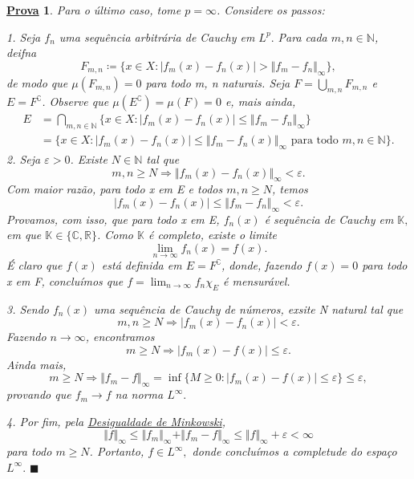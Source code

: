 \documentclass{article}
\newtheorem*{proof*}{\underline{Prova}}
\renewcommand\qedsymbol{$\blacksquare$}
\begin{document}
\begin{proof*}
  
  Para o último caso, tome \(p=\infty\). Considere os passos: 

  1. Seja \(f_{n}\) uma sequência arbitrária de Cauchy em \(L^{p}.\) Para cada \(m, n\in \mathbb{N}\), deifna 
    \[
      F_{m, n}\coloneqq \{x\in X: |f_{m}(x) - f_{n}(x)| > \Vert f_{m}-f_{n} \Vert_{\infty}\},
    \]
  de modo que \(\mu (F_{m, n})=0\) para todo m, n naturais. Seja \(F = \bigcup_{m, n}^{}F_{m, n}\) e \(E = F ^{\complement}\). Observe que \(\mu (E ^{\complement}) = \mu (F) = 0\) e, mais ainda, 
 \begin{align*}
   E &=\bigcap_{m, n\in \mathbb{N}}^{}\{x\in X: |f_{m}(x) - f_{n}(x)| \leq \Vert f_{m}-f_{n} \Vert_{\infty}\}\\
     &=\{x\in X: |f_{m}(x) - f_{n}(x)| \leq \Vert f_{m} - f_{n}(x) \Vert_{\infty}\text{ para todo }m, n\in \mathbb{N}\}.
 \end{align*}
  2. Seja \(\varepsilon  > 0\). Existe \(N\in \mathbb{N}\) tal que 
    \[
      m, n\geq N \Rightarrow \Vert f_{m}(x) - f_{n}(x) \Vert_{\infty} < \varepsilon .
    \]
  Com maior razão, para todo x em E e todos \(m, n\geq N\), temos 
    \[
      |f_{m}(x) - f_{n}(x)|\leq \Vert f_{m} - f_{n} \Vert_{\infty} < \varepsilon .
    \]
    Provamos, com isso, que para todo x em E, \(f_{n}(x)\) é sequência de Cauchy em \(\mathbb{K},\) em que \(\mathbb{K}\in \{\mathbb{C}, \mathbb{R}\}\). Como \(\mathbb{K}\) é completo, existe o limite 
      \[
        \lim_{n\to \infty}f_{n}(x) = f(x).
      \]
    É claro que \(f(x)\) está definida em \(E = F ^{\complement}\), donde, fazendo \(f(x) = 0\) para todo x em F, concluímos que \(f = \lim_{n\to \infty}f_{n}\chi_{E}\) é mensurável.

  3. Sendo \(f_{n}(x)\) uma sequência de Cauchy de números, exsite N natural tal que 
    \[
      m, n \geq N \Rightarrow |f_{m}(x) - f_{n}(x)| < \varepsilon .
    \]
  Fazendo \(n\to \infty\), encontramos 
    \[
      m\geq N \Rightarrow |f_{m}(x) - f(x)|\leq \varepsilon .
    \]
  Ainda mais, 
    \[
    m\geq N \Rightarrow \Vert f_{m}-f \Vert_{\infty} = \inf_{}\{M\geq 0: |f_{m}(x) - f(x)|\leq \varepsilon \}\leq \varepsilon,
    \]
    provando que \(f_m\to f\) na norma \(L^{\infty}.\)

  4. Por fim, pela \hyperlink{minkowski}{\textit{Desigualdade de Minkowski}}, 
    \[
      \Vert f \Vert_{\infty}\leq \Vert f_{m} \Vert_{\infty} + \Vert f_m - f \Vert_{\infty}\leq \Vert f \Vert_{\infty} + \varepsilon  < \infty
    \]
  para todo \(m\geq N\). Portanto, \(f\in L^{\infty},\) donde concluímos a completude do espaço \(L^{\infty}.\) \qedsymbol

\end{proof*}
\end{document}
